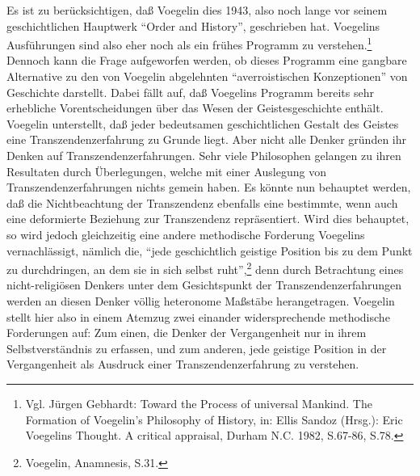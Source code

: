 Es ist zu berücksichtigen, daß Voegelin dies 1943, also noch lange vor seinem
geschichtlichen Hauptwerk "`Order and History"', geschrieben hat. Voegelins
Ausführungen sind also eher noch als ein frühes Programm zu
verstehen.\footnote{Vgl. Jürgen Gebhardt: Toward the Process of universal
  Mankind. The Formation of Voegelin's Philosophy of History, in: Ellis Sandoz
  (Hrsg.): Eric Voegelins Thought. A critical appraisal, Durham N.C. 1982,
  S.67-86, S.78.} Dennoch kann die Frage aufgeworfen werden, ob dieses
Programm eine gangbare Alternative zu den von Voegelin abgelehnten
"`averroistischen Konzeptionen"' von Geschichte darstellt. Dabei fällt auf,
daß Voegelins Programm bereits sehr erhebliche Vorentscheidungen über das
Wesen der Geistesgeschichte enthält.  Voegelin unterstellt, daß jeder
bedeutsamen geschichtlichen Gestalt des Geistes eine Transzendenzerfahrung zu
Grunde liegt. Aber nicht alle Denker gründen ihr Denken auf
Transzendenzerfahrungen. Sehr viele Philosophen gelangen zu ihren Resultaten
durch Überlegungen, welche mit einer Auslegung von Transzendenzerfahrungen
nichts gemein haben. Es könnte nun behauptet werden, daß die Nichtbeachtung
der Transzendenz ebenfalls eine bestimmte, wenn auch eine deformierte
Beziehung zur Transzendenz repräsentiert. Wird dies behauptet, so wird jedoch
gleichzeitig eine andere methodische Forderung Voegelins vernachlässigt,
nämlich die, "`jede geschichtlich geistige Position bis zu dem Punkt zu
durchdringen, an dem sie in sich selbst ruht"',\footnote{Voegelin, Anamnesis,
  S.31.} denn durch Betrachtung eines nicht-religiösen Denkers unter dem
Gesichtspunkt der Transzendenzerfahrungen werden an diesen Denker völlig
heteronome Maßstäbe herangetragen. Voegelin stellt hier also in einem Atemzug
zwei einander widersprechende methodische Forderungen auf: Zum einen, die
Denker der Vergangenheit nur in ihrem Selbstverständnis zu erfassen, und zum
anderen, jede geistige Position in der Vergangenheit als Ausdruck einer
Transzendenzerfahrung zu verstehen.

